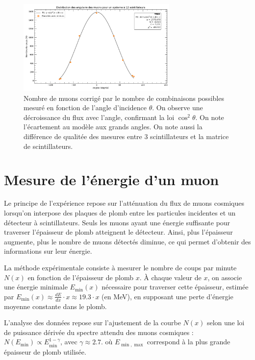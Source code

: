 \documentclass[a4paper,12pt,twoside]{article}
\begin{document}
\begin{figure}[H]
  \centering
  \includegraphics[width=0.7\textwidth]{Images/distribution_angulaire.png}
  \caption{Nombre de muons corrigé par le nombre de combinaisons possibles mesuré en fonction de l'angle d'incidence $\theta$. On observe une décroissance du flux avec l'angle, confirmant la loi $\cos^2\theta$. On note l'écartement au modèle aux grands angles.
  On note aussi la différence de qualitée des mesures entre 3 scintillateurs et la matrice de scintillateurs.}
  \label{fig:cos2s_2}
\end{figure}


\section{Mesure de l’énergie d’un muon}

Le principe de l’expérience repose sur l’atténuation du flux de muons cosmiques lorsqu’on interpose des plaques de plomb entre les particules incidentes et un détecteur à scintillateurs. Seuls les muons ayant une énergie suffisante pour traverser l’épaisseur de plomb atteignent le détecteur.
Ainsi, plus l’épaisseur augmente, plus le nombre de muons détectés diminue, ce qui permet d’obtenir des informations sur leur énergie.

La méthode expérimentale consiste à mesurer le nombre de coups par minute $N(x)$ en fonction de l’épaisseur de plomb $x$.
 À chaque valeur de $x$, on associe une énergie minimale $E_{\min}(x)$ nécessaire pour traverser cette épaisseur, estimée par $E_{\min}(x) \approx \frac{dE}{dx} \cdot x \approx 19.3 \cdot x$ (en MeV), en supposant une perte d’énergie moyenne constante dans le plomb.

L’analyse des données repose sur l’ajustement de la courbe $N(x)$ selon une loi de puissance dérivée du spectre attendu des muons cosmiques : $N(E_{\min}) \propto E_{\min}^{1 - \gamma}$, avec $\gamma \approx 2.7$. 
où $E_{\min,\max}$ correspond à la plus grande épaisseur de plomb utilisée.
\end{document}

